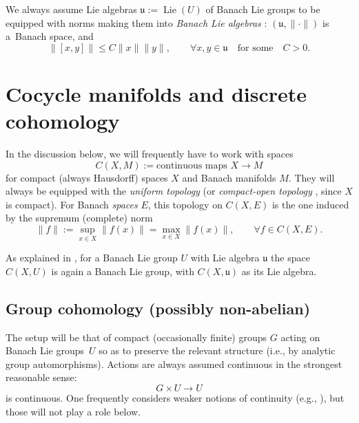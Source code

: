 \documentclass[10pt,a4paper]{amsart}
\numberwithin{equation}{section}
\newcommand\fu{{\mathfrak u}}
\begin{document}
We always assume Lie algebras $\fu:=\operatorname{Lie}(U)$ of Banach Lie groups to be equipped with norms making them into {\it Banach Lie algebras} \cite[discussion following Definition IV.1]{neeb-inf}: $(\fu,\|\cdot\|)$ is a~Banach space, and
\begin{equation*}
 \|[x,y]\|\le C\|x\| \|y\|,\qquad \forall x,y\in \fu \quad\text{for some}\quad C>0.
\end{equation*}

\section{Cocycle manifolds and discrete cohomology}\label{subse:cocyman}

In the discussion below, we will frequently have to work with spaces
\begin{equation*}
 C(X,M)
 :=
 \text{continuous maps }X\to M
\end{equation*}
for compact (always Hausdorff) spaces $X$ and Banach manifolds $M$. They will always be equipped with the {\it uniform topology} (or {\it compact-open topology} \cite[Definition preceding Theorem 46.8]{munk}, since $X$ is compact). For Banach {\it spaces} $E$, this topology on $C(X,E)$ is the one induced by the supremum (complete) norm
\begin{equation*}
 \|f\|:=\sup_{x\in X}\|f(x)\| = \max_{x\in X}\|f(x)\|,\qquad \forall f\in C(X,E).
\end{equation*}

As explained in \cite[Section~3.2]{ps-loop}, for a Banach Lie group $U$ with Lie algebra $\fu$ the space $C(X,U)$ is again a Banach Lie group, with $C(X,\fu)$ as its Lie algebra.

\subsection{Group cohomology (possibly non-abelian)}\label{subse:coh}

The setup will be that of compact (occasionally finite) groups $G$ acting on Banach Lie groups~$U$ so as to preserve the relevant structure (i.e., by analytic group automorphisms). Actions are always assumed continuous in the strongest reasonable sense:
\begin{equation*}
 G\times U\to U
\end{equation*}
is continuous. One frequently considers weaker notions of continuity (e.g., \cite[Section~X.1]{tak2}), but those will not play a role below.
\end{document}
